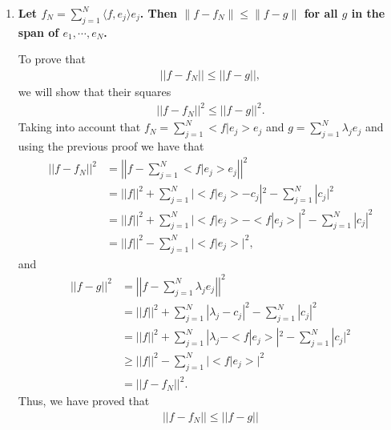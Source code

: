 \begin{enumerate}[label=(\alph*)]
\item \textbf{Let $f_N = \sum_{j=1}^{N} \langle f,e_j \rangle e_j$. Then $\|f - f_N\| \leq \|f - g\|$ for all $g$ in the span of $e_1, \cdots, e_N$. }
\newline

To prove that
\begin{align*}
||f-f_N||\leq||f-g||,
\end{align*}
we will show that their squares
\begin{align*}
||f-f_N||^2\leq||f-g||^2.
\end{align*}
Taking into account that $f_N=\sum_{j=1}^N<f|e_j>e_j$ and $g=\sum_{j=1}^N\lambda_je_j$ and using the previous proof we have that
\begin{align*}
||f-f_N||^2&=\left|\left|f-\sum_{j=1}^N<f|e_j>e_j\right|\right|^2\\
&=||f||^2+\sum_{j=1}^N|<f|e_j>-c_j|^2-\sum_{j=1}^N|c_j|^2\\
&=||f||^2+\sum_{j=1}^N|<f|e_j>-<f|e_j>|^2-\sum_{j=1}^N|c_j|^2\\
&=||f||^2-\sum_{j=1}^N|<f|e_j>|^2,
\end{align*}
and
\begin{align*}
||f-g||^2&=\left|\left|f-\sum_{j=1}^N\lambda_je_j\right|\right|^2\\
&=||f||^2+\sum_{j=1}^N|\lambda_j-c_j|^2-\sum_{j=1}^N|c_j|^2\\
&=||f||^2+\sum_{j=1}^N|\lambda_j-<f|e_j>|^2-\sum_{j=1}^N|c_j|^2\\
&\geq||f||^2-\sum_{j=1}^N|<f|e_j>|^2\\
&=||f-f_N||^2.
\end{align*}
Thus, we have proved that
\begin{align*}
||f-f_N||\leq||f-g||
\end{align*}

\end{enumerate}